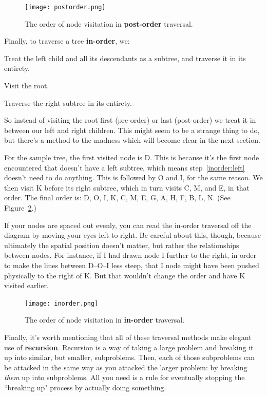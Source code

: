 \begin{figure}[ht]
\centering
\texttt{[image: postorder.png]}
\caption{The order of node visitation in \textbf{post-order} traversal.}
\label{postorder}
\end{figure}


\begin{framed}
Finally, to traverse a tree \textbf{in-order}, we:
\begin{compactenum}
\item \label{inorder:left} Treat the left child and all its descendants as
a subtree, and traverse it in its entirety.
\item Visit the root.
\item Traverse the right subtree in its entirety.
\end{compactenum}
\end{framed}

So instead of visiting the root first (pre-order) or last (post-order) we
treat it in between our left and right children. This might seem to be a
strange thing to do, but there's a method to the madness which will become
clear in the next section.

For the sample tree, the first visited node is D. This is because it's the
first node encountered that doesn't have a left subtree, which means
step~\ref{inorder:left} doesn't need to do anything. This is followed by O
and I, for the same reason. We then visit K before its right subtree, which
in turn visits C, M, and E, in that order. The final order is: D, O, I, K,
C, M, E, G, A, H, F, B, L, N. (See Figure~\ref{inorder}.)

If your nodes are spaced out evenly, you can read the in-order traversal
off the diagram by moving your eyes left to right. Be careful about this,
though, because ultimately the spatial position doesn't matter, but rather
the relationships between nodes. For instance, if I had drawn node I
further to the right, in order to make the lines between D--O--I less
steep, that I node might have been pushed physically to the right of K. But
that wouldn't change the order and have K visited earlier.

\begin{figure}[ht]
\centering
\texttt{[image: inorder.png]}
\caption{The order of node visitation in \textbf{in-order} traversal.}
\label{inorder}
\end{figure}

Finally, it's worth mentioning that all of these traversal methods make
elegant use of \textbf{recursion}. Recursion is a way of taking a large
problem and breaking it up into similar, but smaller, subproblems. Then,
each of those subproblems can be attacked in the same way as you attacked
the larger problem: by breaking \textit{them} up into subproblems. All you
need is a rule for eventually stopping the ``breaking up" process by
actually doing something.

